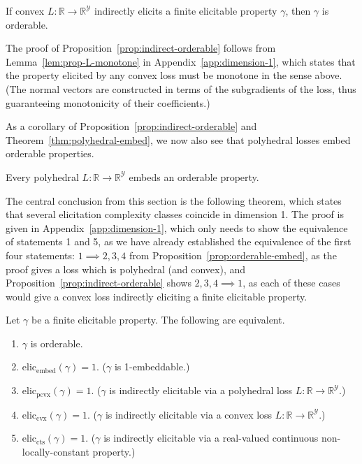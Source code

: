 \documentclass[anon,12pt]{colt2019}
\newcommand{\reals}{\mathbb{R}}
\newcommand{\eliccts}{\mathrm{elic}_\mathrm{cts}}
\newcommand{\eliccvx}{\mathrm{elic}_\mathrm{cvx}}
\newcommand{\elicpoly}{\mathrm{elic}_\mathrm{pcvx}}
\newcommand{\elicembed}{\mathrm{elic}_\mathrm{embed}}
\newcommand{\Y}{\mathcal{Y}}
\begin{document}
\begin{proposition}\label{prop:indirect-orderable}
  If convex $L : \reals \to \reals^\Y$ indirectly elicits a finite elicitable property $\gamma$, then $\gamma$ is orderable.
\end{proposition}

The proof of Proposition~\ref{prop:indirect-orderable} follows from Lemma~\ref{lem:prop-L-monotone} in Appendix~\ref{app:dimension-1}, which states that the property elicited by any convex loss must be monotone in the sense above.
(The normal vectors are constructed in terms of the subgradients of the loss, thus guaranteeing monotonicity of their coefficients.)

As a corollary of Proposition~\ref{prop:indirect-orderable} and Theorem~\ref{thm:polyhedral-embed}, we now also see that polyhedral losses embed orderable properties.

\begin{corollary}\label{cor:embed-orderable}
  Every polyhedral $L : \reals \to \reals^\Y$ embeds an orderable property.
\end{corollary}

The central conclusion from this section is the following theorem, which states that several elicitation complexity classes coincide in dimension 1.
The proof is given in Appendix~\ref{app:dimension-1}, which only needs to show the equivalence of statements 1 and 5, as we have already established the equivalence of the first four statements: $1 \implies 2,3,4$ from Proposition~\ref{prop:orderable-embed}, as the proof gives a loss which is polyhedral (and convex), and Proposition~\ref{prop:indirect-orderable} shows $2,3,4 \implies 1$, as each of these cases would give a convex loss indirectly eliciting a finite elicitable property.
\begin{theorem}\label{thm:1d-tfae}
  Let $\gamma$ be a finite elicitable property.
  The following are equivalent.
  \begin{enumerate}
  \item $\gamma$ is orderable.
  \item $\elicembed(\gamma)=1$. ($\gamma$ is 1-embeddable.)
  \item $\elicpoly(\gamma)=1$. ($\gamma$ is indirectly elicitable via a polyhedral loss $L:\reals\to\reals^\Y$.)
  \item $\eliccvx(\gamma)=1$. ($\gamma$ is indirectly elicitable via a convex loss $L:\reals\to\reals^\Y$.)
  \item $\eliccts(\gamma)=1$. ($\gamma$ is indirectly elicitable via a real-valued continuous non-locally-constant property.)
  \end{enumerate}
\end{theorem}
\end{document}
